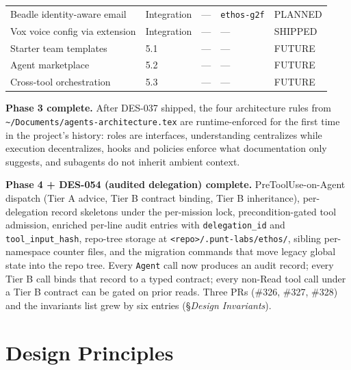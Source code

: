 \documentclass[a4paper,10pt]{article}
\newcommand{\field}[1]{\texttt{#1}}
\newcommand{\fpath}[1]{\texttt{#1}}
\begin{document}
\begin{center}
\begin{longtable}{@{}lllll@{}}
Beadle identity-aware email    & Integration & ---  & \texttt{ethos-g2f} & PLANNED \\
Vox voice config via extension & Integration & ---  & ---            & SHIPPED \\
\midrule
Starter team templates         & 5.1 & ---          & ---            & FUTURE \\
Agent marketplace              & 5.2 & ---          & ---            & FUTURE \\
Cross-tool orchestration       & 5.3 & ---          & ---            & FUTURE \\
\bottomrule
\end{longtable}
\end{center}

\textbf{Phase 3 complete.} After DES-037 shipped, the four
architecture rules from \texttt{\~{}/Documents/agents-architecture.tex}
are runtime-enforced for the first time in the project's history:
roles are interfaces, understanding centralizes while execution
decentralizes, hooks and policies enforce what documentation only
suggests, and subagents do not inherit ambient context.

\textbf{Phase 4 + DES-054 (audited delegation) complete.}
PreToolUse-on-Agent dispatch (Tier A advice, Tier B contract
binding, Tier B inheritance), per-delegation record skeletons
under the per-mission lock, precondition-gated tool admission,
enriched per-line audit entries with \field{delegation\_id} and
\field{tool\_input\_hash}, repo-tree storage at
\fpath{<repo>/.punt-labs/ethos/}, sibling per-namespace counter files, and
the migration commands that move legacy global state into the
repo tree.  Every \texttt{Agent} call now produces an audit
record; every Tier B call binds that record to a typed contract;
every non-Read tool call under a Tier B contract can be gated on
prior reads.  Three PRs (\#326, \#327, \#328) and the invariants
list grew by six entries (\S\textit{Design Invariants}).

\section{Design Principles}
\end{document}
